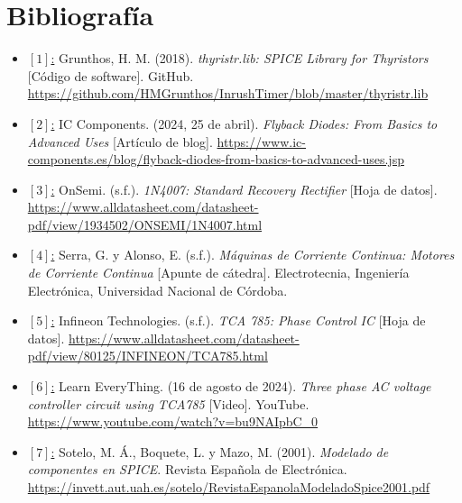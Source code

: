 \documentclass[12pt,a4paper]{article}
\begin{document}
\section{Bibliografía}
\begin{itemize}
    \raggedright
    \item \underline{$[1]$:} Grunthos, H. M. (2018). \textit{thyristr.lib: SPICE Library for Thyristors} [Código de software]. GitHub. \url{https://github.com/HMGrunthos/InrushTimer/blob/master/thyristr.lib}
    
    \item \underline{$[2]$:} IC Components. (2024, 25 de abril). \textit{Flyback Diodes: From Basics to Advanced Uses} [Artículo de blog]. \url{https://www.ic-components.es/blog/flyback-diodes-from-basics-to-advanced-uses.jsp}
    
    \item \underline{$[3]$:} OnSemi. (s.f.). \textit{1N4007: Standard Recovery Rectifier} [Hoja de datos]. \url{https://www.alldatasheet.com/datasheet-pdf/view/1934502/ONSEMI/1N4007.html}

    \item \underline{$[4]$:} Serra, G. y Alonso, E. (s.f.). \textit{Máquinas de Corriente Continua: Motores de Corriente Continua} [Apunte de cátedra]. Electrotecnia, Ingeniería Electrónica, Universidad Nacional de Córdoba.

    \item \underline{$[5]$:} Infineon Technologies. (s.f.). \textit{TCA 785: Phase Control IC} [Hoja de datos]. \url{https://www.alldatasheet.com/datasheet-pdf/view/80125/INFINEON/TCA785.html}

    \item \underline{$[6]$:} Learn EveryThing. (16 de agosto de 2024). \textit{Three phase AC voltage controller circuit using TCA785} [Video]. YouTube. \url{https://www.youtube.com/watch?v=bu9NAIpbC_0}

    \item \underline{$[7]$:} Sotelo, M. Á., Boquete, L. y Mazo, M. (2001). \textit{Modelado de componentes en SPICE}. Revista Española de Electrónica. \url{https://invett.aut.uah.es/sotelo/RevistaEspanolaModeladoSpice2001.pdf}
\end{itemize}
\end{document}
